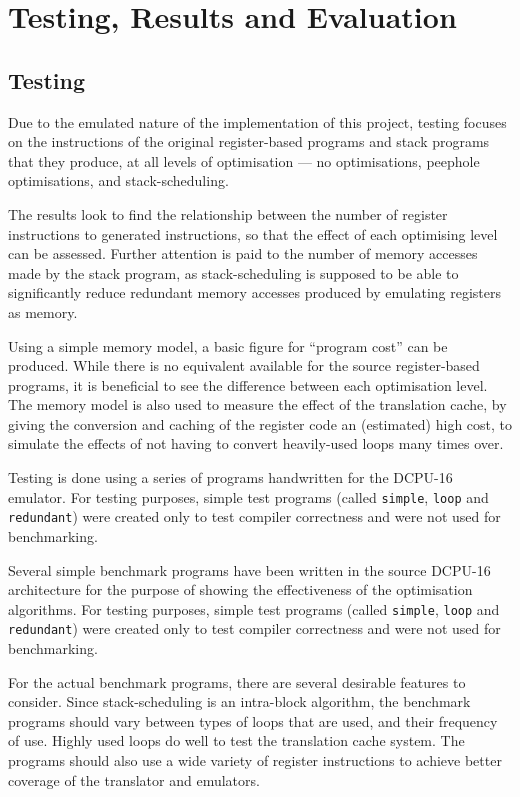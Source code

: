 \chapter{Testing, Results and Evaluation}\label{ch:testingresults}
\section{Testing}

Due to the emulated nature of the implementation of this project, testing
focuses on the instructions of the original register-based programs and stack
programs that they produce, at all levels of optimisation --- no optimisations,
peephole optimisations, and stack-scheduling.

The results look to find the relationship between the number of register
instructions to generated instructions, so that the effect of each optimising
level can be assessed. Further attention is paid to the number of memory
accesses made by the stack program, as stack-scheduling is supposed to be able
to significantly reduce redundant memory accesses produced by emulating
registers as memory.

Using a simple memory model, a basic figure for ``program cost'' can be
produced. While there is no equivalent available for the source register-based
programs, it is beneficial to see the difference between each optimisation
level. The memory model is also used to measure the effect of the translation
cache, by giving the conversion and caching of the register code an (estimated)
high cost, to simulate the effects of not having to convert heavily-used loops
many times over.

Testing is done using a series of programs handwritten for the DCPU-16
emulator. For testing purposes, simple test programs (called \texttt{simple},
\texttt{loop} and \texttt{redundant}) were created only to test compiler
correctness and were not used for benchmarking.

Several simple benchmark programs have been written in the source DCPU-16
architecture for the purpose of showing the effectiveness of the optimisation
algorithms. For testing purposes, simple test programs (called \texttt{simple},
\texttt{loop} and \texttt{redundant}) were created only to test compiler
correctness and were not used for benchmarking.

For the actual benchmark programs, there are several desirable features to
consider. Since stack-scheduling is an intra-block algorithm, the benchmark
programs should vary between types of loops that are used, and their frequency
of use. Highly used loops do well to test the translation cache system. The
programs should also use a wide variety of register instructions to achieve
better coverage of the translator and emulators.

